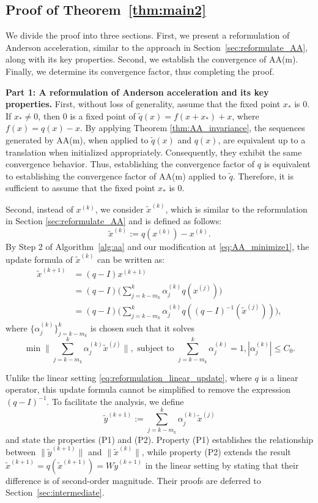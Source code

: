 \documentclass[11pt]{article}
\begin{document}
{{\subsection{Proof of Theorem~\ref{thm:main2}}
We divide the proof into three sections. 
First, we present a reformulation of Anderson acceleration, similar to the approach in Section~\ref{sec:reformulate_AA}, along with its key properties. 
Second, we establish the convergence of AA(m). 
Finally, we determine its convergence factor, thus completing the proof. 
\vspace{0.1in}

\textbf{Part 1: A reformulation of Anderson acceleration and its key  properties.} 
First, without loss of generality, assume that the fixed point $x_*$ is $0$. If $x_*\neq 0$, then $0$ is a fixed point of $\widetilde{q}(x)=f(x+x_*)+x$, where $f(x)=q(x)-x$.  By applying Theorem \ref{thm:AA_invariance}, the sequences generated by AA(m), when applied to $\widetilde{q}(x)$ and $q(x)$, are equivalent up to a translation when initialized appropriately. Consequently, they exhibit the same convergence behavior. 
Thus, establishing the convergence factor of  $q$ is equivalent to establishing the convergence factor of AA(m) applied to $\widetilde{q}$. Therefore, it is sufficient to assume that the fixed point $x_*$ is $0$.


Second, instead of $x^{(k)}$, we consider $\widetilde{x}^{(k)}$, which is similar to the reformulation in Section \ref{sec:reformulate_AA} and is  defined as follows: 
\[
\widetilde{x}^{(k)}:=q(x^{(k)})-x^{(k)}.
\]
By Step 2 of Algorithm~\ref{alg:aa} and our modification at \eqref{eq:AA_minimize1}, the update formula of $\widetilde{x}^{(k)}$ can be written as: 
\begin{align}
\widetilde{x}^{(k+1)}&=(q-I)x^{(k+1)} \nonumber \\
&=(q-I)\big(\sum_{j=k-m_k}^{k}\alpha_j^{(k)} q(x^{(j)})\big) \nonumber \\
&=(q-I)\Big(\sum_{j=k-m_k}^{k}\alpha_j^{(k)}q\left((q-I)^{-1}(\widetilde{x}^{(j)})\right)\Big),\label{eq:update_nonlinear2}
\end{align}
where $\{\alpha_j^{(k)}\}_{j=k-m_k}^k$ is chosen such that it solves 
\[
\min\Big\|\sum_{j=k-m_k}^{k}\alpha_j^{(k)}\widetilde{x}^{(j)}\Big\|,\,\,\text{subject to }\sum_{j=k-m_k}^{k} \alpha_j^{(k)}=1, |\alpha_j^{(k)}|\leq C_0.
\]

Unlike the linear setting \eqref{eq:reformulation_linear_update}, where $q$ is a linear operator, this update formula  cannot be simplified to remove the expression $(q-I)^{-1}$. To facilitate the analysis, we define
\[\widetilde{y}^{(k+1)}:=\sum_{j=k-m_k}^{k}\alpha_j^{(k)}\widetilde{x}^{(j)}%
\]
  and state the properties (P1) and (P2).  Property (P1)  establishes the relationship between  $\|\widetilde{y}^{(k+1)}\|$ and $ \|\widetilde{x}^{(k)}\|$, while  property (P2) extends the result $\widetilde{x}^{(k+1)}=q(\widetilde{x}^{(k+1)})=W\widetilde{y}^{(k+1)}$ in the linear setting by stating that their difference is of second-order magnitude. Their proofs are deferred to Section~\ref{sec:intermediate}. \vspace{0.05in}

}}
\end{document}
